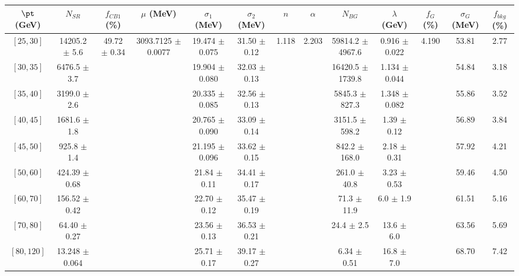 \begin{tabular}{c||c|c|c|c|c|c|c|c|c|c|c||c}
$\pt$ (GeV) & $N_{SR}$ & $f_{CB1}$ (\%) & $\mu$ (MeV) & $\sigma_1$ (MeV) & $\sigma_2$ (MeV) & $n$ & $\alpha$ & $N_{BG}$ & $\lambda$ (GeV) & $f_G$ (\%) & $\sigma_G$ (MeV) & $f_{bkg}$ (\%) \\
\hline
$[25, 30]$ & 14205.2 $\pm$ 5.6 & \multirow{9}{*}{49.72 $\pm$ 0.34} & \multirow{9}{*}{3093.7125 $\pm$ 0.0077} & 19.474 $\pm$ 0.075 & 31.50 $\pm$ 0.12 & \multirow{9}{*}{1.118} & \multirow{9}{*}{2.203} & 59814.2 $\pm$ 4967.6 & 0.916 $\pm$ 0.022 & \multirow{9}{*}{4.190} & 53.81 & 2.77\\
$[30, 35]$ & 6476.5 $\pm$ 3.7 &  &  & 19.904 $\pm$ 0.080 & 32.03 $\pm$ 0.13 &  &  & 16420.5 $\pm$ 1739.8 & 1.134 $\pm$ 0.044 &  & 54.84 & 3.18\\
$[35, 40]$ & 3199.0 $\pm$ 2.6 &  &  & 20.335 $\pm$ 0.085 & 32.56 $\pm$ 0.13 &  &  & 5845.3 $\pm$ 827.3 & 1.348 $\pm$ 0.082 &  & 55.86 & 3.52\\
$[40, 45]$ & 1681.6 $\pm$ 1.8 &  &  & 20.765 $\pm$ 0.090 & 33.09 $\pm$ 0.14 &  &  & 3151.5 $\pm$ 598.2 & 1.39 $\pm$ 0.12 &  & 56.89 & 3.84\\
$[45, 50]$ & 925.8 $\pm$ 1.4 &  &  & 21.195 $\pm$ 0.096 & 33.62 $\pm$ 0.15 &  &  & 842.2 $\pm$ 168.0 & 2.18 $\pm$ 0.31 &  & 57.92 & 4.21\\
$[50, 60]$ & 424.39 $\pm$ 0.68 &  &  & 21.84 $\pm$ 0.11 & 34.41 $\pm$ 0.17 &  &  & 261.0 $\pm$ 40.8 & 3.23 $\pm$ 0.53 &  & 59.46 & 4.50\\
$[60, 70]$ & 156.52 $\pm$ 0.42 &  &  & 22.70 $\pm$ 0.12 & 35.47 $\pm$ 0.19 &  &  & 71.3 $\pm$ 11.9 & 6.0 $\pm$ 1.9 &  & 61.51 & 5.16\\
$[70, 80]$ & 64.40 $\pm$ 0.27 &  &  & 23.56 $\pm$ 0.13 & 36.53 $\pm$ 0.21 &  &  & 24.4 $\pm$ 2.5 & 13.6 $\pm$ 6.0 &  & 63.56 & 5.69\\
$[80, 120]$ & 13.248 $\pm$ 0.064 &  &  & 25.71 $\pm$ 0.17 & 39.17 $\pm$ 0.27 &  &  & 6.34 $\pm$ 0.51 & 16.8 $\pm$ 7.0 &  & 68.70 & 7.42\\
\end{tabular}
